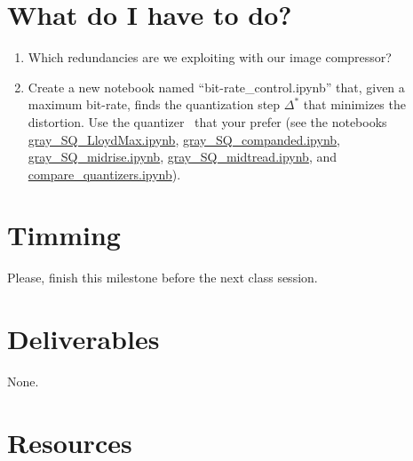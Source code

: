 \section{What do I have to do?}
\begin{enumerate}
\item Which redundancies are we exploiting with our image compressor? 
\item Create a new notebook named ``bit-rate\_control.ipynb'' that,
  given a maximum bit-rate, finds the quantization step $\Delta^*$
  that minimizes the distortion. Use the
  quantizer~\cite{vruiz__scalar_quantization} that your prefer (see
  the notebooks
  \href{https://github.com/Sistemas-Multimedia/Sistemas-Multimedia.github.io/blob/master/contents/gray_SQ/gray_SQ_LloydMax.ipynb}{gray\_SQ\_LloydMax.ipynb},
  \href{https://github.com/Sistemas-Multimedia/Sistemas-Multimedia.github.io/blob/master/contents/gray_SQ/gray_SQ_companded.ipynb}{gray\_SQ\_companded.ipynb},
  \href{https://github.com/Sistemas-Multimedia/Sistemas-Multimedia.github.io/blob/master/contents/gray_SQ/gray_SQ_midrise.ipynb}{gray\_SQ\_midrise.ipynb},
  \href{https://github.com/Sistemas-Multimedia/Sistemas-Multimedia.github.io/blob/master/contents/gray_SQ/gray_SQ_midtread.ipynb}{gray\_SQ\_midtread.ipynb},
  and
  \href{https://github.com/Sistemas-Multimedia/Sistemas-Multimedia.github.io/blob/master/contents/gray_SQ/compare_quantizers.ipynb}{compare\_quantizers.ipynb}).
\end{enumerate}

\section{Timming}
Please, finish this milestone before the next class session.

\section{Deliverables}
None.

\section{Resources}
\renewcommand{\addcontentsline}[3]{} %



